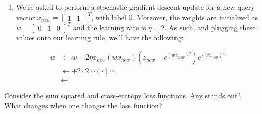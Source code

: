 \documentclass[12pt]{article}
\begin{document}
\begin{enumerate}[leftmargin=\labelsep]
\begin{enumerate}
{      $$
        w \leftarrow w + 2\eta \sum_{i=1}^N x_i (w x_i) (z_i - e^{(w x_i)^2}) e^{(w x_i)^2}
      $$
    }
    \item {
      We're asked to perform a stochastic gradient descent update for a new query
      vector $x_{new} = \begin{bmatrix}1 & 1\end{bmatrix}^T$, with label $0$.
      Moreover, the weights are initialized as $w = \begin{bmatrix}0 & 1 & 0\end{bmatrix}^T$
      and the learning rate is $\eta = 2$. As such, and plugging these values
      onto our learning rule, we'll have the following:

      \begin{align*}
        w & \leftarrow w + 2\eta x_{new} (w x_{new}) (z_{new} - e^{(w x_{new})^2}) e^{(w x_{new})^2} \\        
          & \leftarrow  + 2 \cdot 2 \cdot
           \cdot \left(
             \cdot 
          \right) \cdots \\
          & \leftarrow 
      \end{align*}

    }
  \end{enumerate}

  \begin{tcolorbox}[enhanced jigsaw,colback=bg,boxrule=0pt,arc=1pt,halign=center]
    \item Consider the sum squared and cross-entropy loss functions. Any stands out?
    What changes when one changes the loss function?
  \end{tcolorbox}

\end{enumerate}
\end{document}
